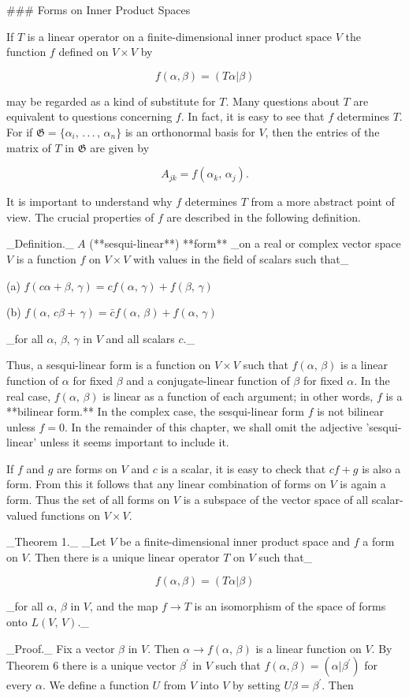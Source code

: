 

### Forms on Inner Product Spaces

If \(T\) is a linear operator on a finite-dimensional inner product space \(V\) the function \(f\) defined on \(V\times V\) by

\[f(\alpha,\beta)=(T\alpha|\beta)\]

may be regarded as a kind of substitute for \(T\). Many questions about \(T\) are equivalent to questions concerning \(f\). In fact, it is easy to see that \(f\) determines \(T\). For if \(\mathfrak{G}=\{\alpha_{i},\,.\,.\,.\,,\,\alpha_{n}\}\) is an orthonormal basis for \(V\), then the entries of the matrix of \(T\) in \(\mathfrak{G}\) are given by

\[A_{jk}=f(\alpha_{k},\,\alpha_{j}).\]

It is important to understand why \(f\) determines \(T\) from a more abstract point of view. The crucial properties of \(f\) are described in the following definition.

_Definition._ \(A\) (**sesqui-linear**) **form** _on a real or complex vector space \(V\) is a function \(f\) on \(V\times V\) with values in the field of scalars such that_

(a) \(f(c\alpha+\beta,\,\gamma)=cf(\alpha,\,\gamma)+f(\beta,\,\gamma)\)

(b) \(f(\alpha,\,c\beta+\,\gamma)=\bar{c}f(\alpha,\,\beta)+f(\alpha,\,\gamma)\)

_for all \(\alpha,\,\beta,\,\gamma\) in \(V\) and all scalars \(c\)._

Thus, a sesqui-linear form is a function on \(V\times V\) such that \(f(\alpha,\,\beta)\) is a linear function of \(\alpha\) for fixed \(\beta\) and a conjugate-linear function of \(\beta\) for fixed \(\alpha\). In the real case, \(f(\alpha,\,\beta)\) is linear as a function of each argument; in other words, \(f\) is a **bilinear form.** In the complex case, the sesqui-linear form \(f\) is not bilinear unless \(f=0\). In the remainder of this chapter, we shall omit the adjective 'sesqui-linear' unless it seems important to include it.

If \(f\) and \(g\) are forms on \(V\) and \(c\) is a scalar, it is easy to check that \(cf+g\) is also a form. From this it follows that any linear combination of forms on \(V\) is again a form. Thus the set of all forms on \(V\) is a subspace of the vector space of all scalar-valued functions on \(V\times V\).

_Theorem 1._ _Let \(V\) be a finite-dimensional inner product space and \(f\) a form on \(V\). Then there is a unique linear operator \(T\) on \(V\) such that_

\[f(\alpha,\beta)=(T\alpha|\beta)\]

_for all \(\alpha,\,\beta\) in \(V\), and the map \(f\to T\) is an isomorphism of the space of forms onto \(L(V,\,V)\)._

_Proof._ Fix a vector \(\beta\) in \(V\). Then \(\alpha\to f(\alpha,\,\beta)\) is a linear function on \(V\). By Theorem 6 there is a unique vector \(\beta^{\prime}\) in \(V\) such that \(f(\alpha,\beta)=(\alpha|\beta^{\prime})\) for every \(\alpha\). We define a function \(U\) from \(V\) into \(V\) by setting \(U\beta=\beta^{\prime}\). Then